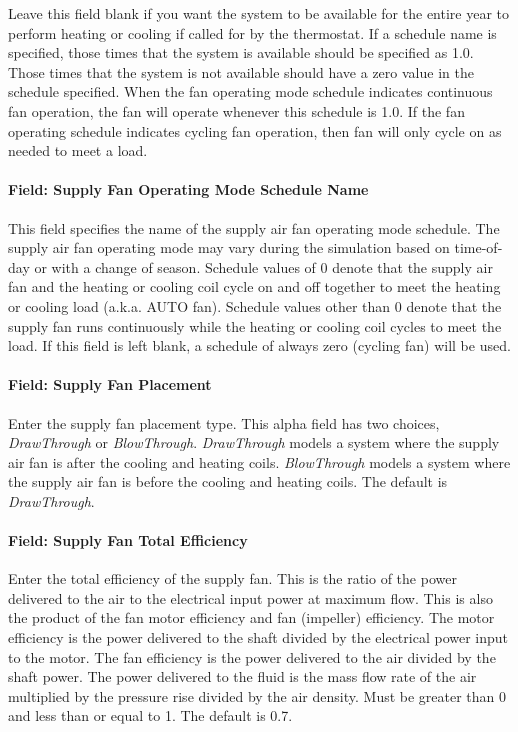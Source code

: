 Leave this field blank if you want the system to be available for the entire year to perform heating or cooling if called for by the thermostat. If a schedule name is specified, those times that the system is available should be specified as 1.0. Those times that the system is not available should have a zero value in the schedule specified. When the fan operating mode schedule indicates continuous fan operation, the fan will operate whenever this schedule is 1.0. If the fan operating schedule indicates cycling fan operation, then fan will only cycle on as needed to meet a load.

\paragraph{Field: Supply Fan Operating Mode Schedule Name}\label{field-supply-fan-operating-mode-schedule-name-3}

This field specifies the name of the supply air fan operating mode schedule. The supply air fan operating mode may vary during the simulation based on time-of-day or with a change of season. Schedule values of 0 denote that the supply air fan and the heating or cooling coil cycle on and off together to meet the heating or cooling load (a.k.a. AUTO fan). Schedule values other than 0 denote that the supply fan runs continuously while the heating or cooling coil cycles to meet the load. If this field is left blank, a schedule of always zero (cycling fan) will be used.

\paragraph{Field: Supply Fan Placement}\label{field-supply-fan-placement-3}

Enter the supply fan placement type. This alpha field has two choices, \emph{DrawThrough} or \emph{BlowThrough}. \emph{DrawThrough} models a system where the supply air fan is after the cooling and heating coils. \emph{BlowThrough} models a system where the supply air fan is before the cooling and heating coils. The default is \emph{DrawThrough}.

\paragraph{Field: Supply Fan Total Efficiency}\label{field-supply-fan-total-efficiency-4}

Enter the total efficiency of the supply fan. This is the ratio of the power delivered to the air to the electrical input power at maximum flow. This is also the product of the fan motor efficiency and fan (impeller) efficiency. The motor efficiency is the power delivered to the shaft divided by the electrical power input to the motor. The fan efficiency is the power delivered to the air divided by the shaft power. The power delivered to the fluid is the mass flow rate of the air multiplied by the pressure rise divided by the air density. Must be greater than 0 and less than or equal to 1. The default is 0.7.

